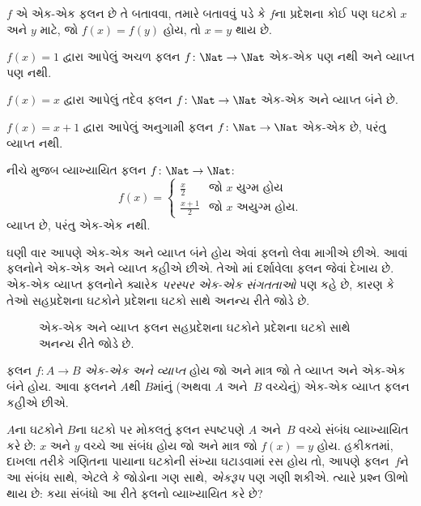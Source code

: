 \begin{explain}
$f$ એ એક-એક ફલન છે તે બતાવવા, તમારે બતાવવું પડે
કે $f$ના પ્રદેશના કોઈ પણ ઘટકો $x$ અને $y$
માટે, જો $f(x)=f(y)$ હોય, તો $x=y$ થાય છે.
\end{explain}

\begin{ex}
$f(x) = 1$ દ્વારા આપેલું અચળ ફલન
$f\colon \Nat \to \Nat$ એક-એક પણ નથી
અને વ્યાપ્ત પણ નથી.

$f(x) = x$ દ્વારા આપેલું તદેવ ફલન
$f\colon \Nat \to \Nat$ એક-એક અને
વ્યાપ્ત બંને છે.

$f(x) = x+1$ દ્વારા આપેલું અનુગામી ફલન
$f \colon \Nat \to \Nat$ એક-એક છે,
પરંતુ વ્યાપ્ત નથી.

નીચે મુજબ વ્યાખ્યાયિત ફલન $f \colon \Nat \to \Nat$:
\[
  f(x) =
  \begin{cases}
    \frac{x}{2} & \text{જો $x$ યુગ્મ હોય} \\
    \frac{x+1}{2} & \text{જો $x$ અયુગ્મ હોય.}
  \end{cases}
\]
વ્યાપ્ત છે, પરંતુ એક-એક નથી.
\end{ex}

\begin{explain}
ઘણી વાર આપણે એક-એક અને વ્યાપ્ત બંને
હોય એવાં ફલનો લેવા માગીએ છીએ. આવાં ફલનોને
એક-એક અને વ્યાપ્ત કહીએ છીએ. તેઓ
માં દર્શાવેલા ફલન જેવાં દેખાય છે.
એક-એક વ્યાપ્ત ફલનોને ક્યારેક \emph{પરસ્પર એક-એક સંગતતાઓ}
પણ કહે છે, કારણ કે તેઓ સહપ્રદેશના ઘટકોને પ્રદેશના
ઘટકો સાથે અનન્ય રીતે જોડે છે.
\begin{figure}
  \caption{એક-એક અને વ્યાપ્ત ફલન સહપ્રદેશના ઘટકોને
    પ્રદેશના ઘટકો સાથે અનન્ય રીતે જોડે છે.}
\end{figure}
\end{explain}

\begin{defn}[એક-એક વ્યાપ્ત ફલન]
ફલન $f \colon A \to B$ \emph{એક-એક અને વ્યાપ્ત} હોય
જો અને માત્ર જો તે વ્યાપ્ત અને એક-એક
બંને હોય. આવા ફલનને $A$થી $B$માંનું
(અથવા $A$ અને~$B$ વચ્ચેનું) એક-એક વ્યાપ્ત ફલન કહીએ છીએ.
\end{defn}
\endgroup


\begingroup
\makeatletter{}\makeatother


\label{guunit:OLP-0023}


\begin{explain}
$A$ના ઘટકોને $B$ના ઘટકો પર મોકલતું
ફલન સ્પષ્ટપણે $A$ અને~$B$ વચ્ચે સંબંધ વ્યાખ્યાયિત
કરે છે: $x$ અને $y$ વચ્ચે આ સંબંધ હોય જો અને માત્ર જો
$f(x) = y$ હોય. હકીકતમાં, દાખલા તરીકે ગણિતના પાયાના
ઘટકોની સંખ્યા ઘટાડવામાં રસ હોય તો, આપણે ફલન~$f$ને
આ સંબંધ સાથે, એટલે કે જોડોના ગણ સાથે, \emph{એકરૂપ}
પણ ગણી શકીએ. ત્યારે પ્રશ્ન ઊભો થાય છે: કયા સંબંધો
આ રીતે ફલનો વ્યાખ્યાયિત કરે છે?
\end{explain}

